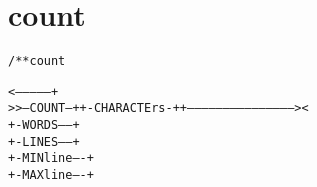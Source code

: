 \section{count}
\begin{shaded}
\begin{alltt}
/** count


              <--------------+
   >>--COUNT--++-CHARACTErs-++--------------------------------------------><
               +-WORDS------+
               +-LINES------+
               +-MINline----+
               +-MAXline----+

\end{alltt}
\end{shaded}
